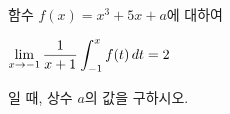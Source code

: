 함수 $f(x)=x^3+5x+a$에 대하여 \par\smallskip\noindent\hspace*{1.5em}$\displaystyle\lim_{x\to -1}\dfrac{1}{x+1}\int_{-1}^{x}f(t)\mkern3mu dt=2$\par\smallskip\noindent 일 때, 상수 $a$의 값을 구하시오.
